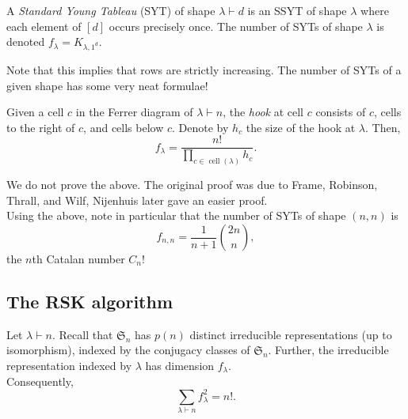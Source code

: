 	\begin{fdef}
		A \emph{Standard Young Tableau} (SYT) of shape $\lambda\vdash d$ is an SSYT of shape $\lambda$ where each element of $[d]$ occurs precisely once. The number of SYTs of shape $\lambda$ is denoted $f_\lambda = K_{\lambda,1^d}$.
	\end{fdef}
	Note that this implies that rows are strictly increasing. The number of SYTs of a given shape has some very neat formulae!

	\begin{ftheo}
		Given a cell $c$ in the Ferrer diagram of $\lambda \vdash n$, the \emph{hook} at cell $c$ consists of $c$, cells to the right of $c$, and cells below $c$. Denote by $h_c$ the size of the hook at $\lambda$. Then,
		\[ f_\lambda = \frac{n!}{\prod_{c \in \operatorname{cell}(\lambda)} h_c}. \]
	\end{ftheo}
	We do not prove the above. The original proof was due to Frame, Robinson, Thrall, and Wilf, Nijenhuis later gave an easier proof.\\
	Using the above, note in particular that the number of SYTs of shape $(n,n)$ is
	\[ f_{n,n} = \frac{1}{n+1} \binom{2n}{n}, \]
	the $n$th Catalan number $C_n$!

\subsection{The RSK algorithm}

	\begin{ftheo}
		Let $\lambda \vdash n$. Recall that $\mathfrak{S}_n$ has $p(n)$ distinct irreducible representations (up to isomorphism), indexed by the conjugacy classes of $\mathfrak{S}_n$. Further, the irreducible representation indexed by $\lambda$ has dimension $f_\lambda$.\\
		Consequently,
		\[ \sum_{\lambda \vdash n} f_\lambda^2 = n!. \]
	\end{ftheo}


